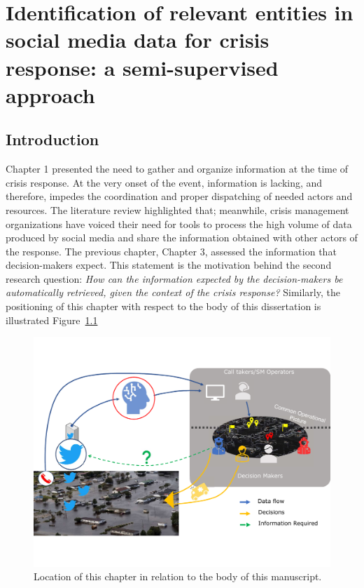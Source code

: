 \chapter {Identification of relevant entities in social media data for crisis response: a semi-supervised approach}

\section*{Introduction}
Chapter 1 presented the need to gather and organize information at the time of crisis
response.
At the very onset of the event, information is lacking, and therefore,
impedes the coordination and proper dispatching of needed actors and resources.
The literature review highlighted that; meanwhile, crisis management organizations have
voiced their need for tools to process the high volume of data produced by social media
and share the information obtained with other actors of the response.
The previous chapter, Chapter 3, assessed the information that decision-makers expect.
This statement is the motivation behind the second research question: \textit{How can the information expected by the decision-makers be automatically retrieved, given the context of the crisis response?}
Similarly, the positioning of this chapter with respect to the body of this dissertation is illustrated Figure~\ref{processing:big-picture-manuscrit}

\begin{figure}[htb]
    \centering
    \includegraphics[width=\textwidth]{figures/chap-4/position-chapter.pdf}
    \caption{Location of this chapter in relation to the body of this manuscript.}
    \label{processing:big-picture-manuscrit}
\end{figure}


